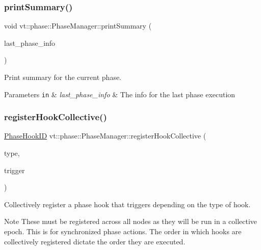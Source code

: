 \subsubsection{\texorpdfstring{print\+Summary()}{printSummary()}}
{\footnotesize\ttfamily void vt\+::phase\+::\+Phase\+Manager\+::print\+Summary (\begin{DoxyParamCaption}\item[{\hyperlink{structvt_1_1vrt_1_1collection_1_1lb_1_1_phase_info}{vrt\+::collection\+::lb\+::\+Phase\+Info} $\ast$}]{last\+\_\+phase\+\_\+info }\end{DoxyParamCaption})}



Print summary for the current phase. 


\begin{DoxyParams}[1]{Parameters}
\mbox{\tt in}  & {\em last\+\_\+phase\+\_\+info} & The info for the last phase execution \\
\hline
\end{DoxyParams}
\mbox{\label{structvt_1_1phase_1_1_phase_manager_a31f6a6f91315fb68826ee073a7cb0a14}} 
\subsubsection{\texorpdfstring{register\+Hook\+Collective()}{registerHookCollective()}}
{\footnotesize\ttfamily \hyperlink{structvt_1_1phase_1_1_phase_hook_i_d}{Phase\+Hook\+ID} vt\+::phase\+::\+Phase\+Manager\+::register\+Hook\+Collective (\begin{DoxyParamCaption}\item[{\hyperlink{namespacevt_1_1phase_aec9a63fdd99680d7a7fe99d321193811}{Phase\+Hook}}]{type,  }\item[{\hyperlink{namespacevt_ae0a5a7b18cc99d7b732cb4d44f46b0f3}{Action\+Type}}]{trigger }\end{DoxyParamCaption})}



Collectively register a phase hook that triggers depending on the type of hook. 

\begin{DoxyNote}{Note}
These must be registered across all nodes as they will be run in a collective epoch. This is for synchronized phase actions. The order in which hooks are collectively registered dictate the order they are executed.
\end{DoxyNote}

